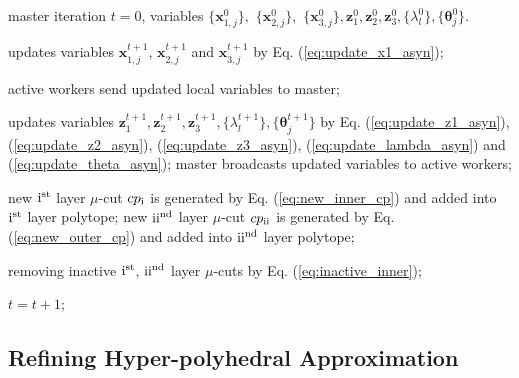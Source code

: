 \documentclass[letterpaper]{article} %
\begin{document}
\begin{algorithm}[t]
   \caption{Asynchronous Federated Trilevel Learning}
\begin{algorithmic}
     master iteration $t\! =\! 0$, variables $\{{{\boldsymbol{x}}_{1,j}^0}\},$ $ \{{{\boldsymbol{x}}_{2,j}^0}\}, $ $ \{{{\boldsymbol{x}}_{3,j}^0}\}, \boldsymbol{z}_1^0, \boldsymbol{z}_2^0, \boldsymbol{z}_3^0, \{\lambda_l^0\}, \{\boldsymbol{\theta}_j^0\}$.

   \REPEAT

   \STATE updates variables $\boldsymbol{x}_{1,j}^{t+1}$, $\boldsymbol{x}_{2,j}^{t+1}$ and $\boldsymbol{x}_{3,j}^{t+1}$ by Eq. (\ref{eq:update_x1_asyn});
   \ENDFOR

   \STATE active workers send updated local variables to master;

   \STATE updates variables $\boldsymbol{z}_1^{t+1}, \boldsymbol{z}_2^{t+1}, \boldsymbol{z}_3^{t+1}, \{\lambda_l^{t+1}\}, \{\boldsymbol{\theta}_j^{t+1}\}$  by Eq. (\ref{eq:update_z1_asyn}), (\ref{eq:update_z2_asyn}), (\ref{eq:update_z3_asyn}), (\ref{eq:update_lambda_asyn}) and (\ref{eq:update_theta_asyn});
   \ENDFOR
   \STATE master broadcasts updated variables to active workers;


   \STATE   new ${\rm{\uppercase\expandafter{\romannumeral1}}}^{\rm{st}}$ layer $\mu$-cut ${cp_{\rm{\uppercase\expandafter{\romannumeral1}}}}$ is generated by Eq. (\ref{eq:new_inner_cp}) and added into ${\rm{\uppercase\expandafter{\romannumeral1}}}^{\rm{st}}$ layer polytope;
   \STATE   new ${\rm{\uppercase\expandafter{\romannumeral2}}}^{\rm{nd}}$ layer $\mu$-cut ${cp_{\rm{\uppercase\expandafter{\romannumeral2}}}}$ is generated by Eq. (\ref{eq:new_outer_cp}) and added into ${\rm{\uppercase\expandafter{\romannumeral2}}}^{\rm{nd}}$ layer polytope;

   \STATE removing inactive ${\rm{\uppercase\expandafter{\romannumeral1}}}^{\rm{st}}$,  ${\rm{\uppercase\expandafter{\romannumeral2}}}^{\rm{nd}}$ layer $\mu$-cuts by Eq. (\ref{eq:inactive_inner});
   \ENDIF


   \STATE $t =t+1$;

\end{algorithmic}
\label{algorithm:asyn}
\end{algorithm}

\subsection{Refining Hyper-polyhedral Approximation}
\end{document}
